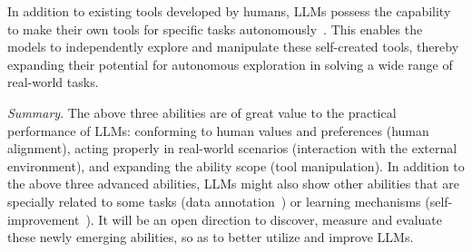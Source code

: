 {
In addition to existing tools developed by humans, LLMs possess the capability to make their own tools for specific tasks autonomously~\cite{Cai-arxiv-2023-Tool}. 
This enables the models to independently explore and manipulate these self-created tools, thereby expanding their potential for autonomous exploration  in solving a wide range of real-world tasks.}


{\emph{Summary}. The above three abilities are of great value to the practical performance of LLMs: conforming  to 
human values and preferences (human alignment), acting properly in real-world scenarios (interaction with the external environment), and expanding the ability scope (tool manipulation). 
In addition to the above three advanced abilities, LLMs might  also show other    abilities that are specially related to some tasks (\eg data annotation~\cite{Gilardi-arXiv-2023-Crowd}) or learning mechanisms (\eg self-improvement~\cite{Huang-arxiv-2022-Large}).
It will be an open direction to discover, measure and evaluate these newly emerging abilities, so as to better utilize  and improve LLMs.  
}